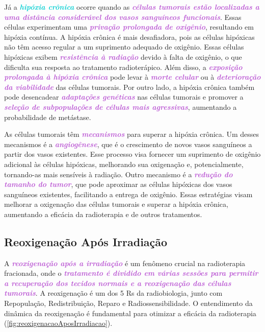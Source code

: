 \documentclass[11pt,a4paper]{article}
\begin{document}
	Já a \textcolor{DarkTurquoise}{\textbf{\textit{hipóxia crônica}}} ocorre quando as \textcolor{MediumOrchid}{\textbf{\textit{células tumorais estão localizadas a uma distância considerável dos vasos sanguíneos funcionais}}}. Essas células experimentam uma \textcolor{MediumOrchid}{\textbf{\textit{privação prolongada de oxigênio}}}, resultando em hipóxia contínua. A hipóxia crônica é mais desafiadora, pois as células hipóxicas não têm acesso regular a um suprimento adequado de oxigênio. Essas células hipóxicas exibem \textcolor{MediumOrchid}{\textbf{\textit{resistência à radiação}}} devido à falta de oxigênio, o que dificulta sua resposta ao tratamento radioterápico. Além disso, a \textcolor{MediumOrchid}{\textbf{\textit{exposição prolongada à hipóxia crônica}}} pode levar à \textcolor{MediumOrchid}{\textbf{\textit{morte celular}}} ou à \textcolor{MediumOrchid}{\textbf{\textit{deterioração da viabilidade}}} das células tumorais. Por outro lado, a hipóxia crônica também pode desencadear \textcolor{MediumOrchid}{\textbf{\textit{adaptações genéticas}}} nas células tumorais e promover a \textcolor{MediumOrchid}{\textbf{\textit{seleção de subpopulações de células mais agressivas}}}, aumentando a probabilidade de metástase.

	As células tumorais têm \textcolor{MediumOrchid}{\textbf{\textit{mecanismos}}} para superar a hipóxia crônica. Um desses mecanismos é a \textcolor{MediumOrchid}{\textbf{\textit{angiogênese}}}, que é o crescimento de novos vasos sanguíneos a partir dos vasos existentes. Esse processo visa fornecer um suprimento de oxigênio adicional às células hipóxicas, melhorando sua oxigenação e, potencialmente, tornando-as mais sensíveis à radiação. Outro mecanismo é a \textcolor{MediumOrchid}{\textbf{\textit{redução do tamanho do tumor}}}, que pode aproximar as células hipóxicas dos vasos sanguíneos existentes, facilitando a entrega de oxigênio. Essas estratégias visam melhorar a oxigenação das células tumorais e superar a hipóxia crônica, aumentando a eficácia da radioterapia e de outros tratamentos.

\subsection*{Reoxigenação Após Irradiação}

	A \textcolor{MediumOrchid}{\textbf{\textit{reoxigenação após a irradiação}}} é um fenômeno crucial na radioterapia fracionada, onde o \textcolor{MediumOrchid}{\textbf{\textit{tratamento é dividido em várias sessões para permitir a recuperação dos tecidos normais e a reoxigenação das células tumorais}}}. A reoxigenação é um dos 5 Rs da radiobiologia, junto com Repopulação, Redistribuição, Reparo e Radiossensibilidade. O entendimento da dinâmica da reoxigenação é fundamental para otimizar a eficácia da radioterapia (\ref{fig:reoxigenacaoAposIrradiacao}).
\end{document}
